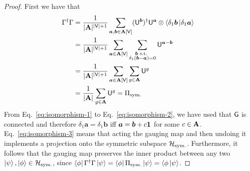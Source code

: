 \documentclass[11pt]{article}
\begin{document}
\begin{proof}
    First we have that 
\begin{align}
     \Gamma^\dagger \Gamma &= \frac{1}{|\mathbf{A}|^{|\mathsf{V}|+1}} \sum_{\bm{a}, \bm{b} \in \mathbf{A}[\mathsf{V}]} (\mathsf{U}^{\bm{b}})^\dagger \mathsf{U}^{\bm{a}} \otimes \langle \delta_1 \bm{b} \ket{\delta_1 \bm{a}} \\
     &= \frac{1}{|\mathbf{A}|^{|\mathsf{V}|+1}} \sum_{\bm{a} \in \mathbf{A}[\mathsf{V}]} \sum_{\substack{\bm{b} \text{ s.t. } \\ \delta_1 (\bm{b} - \bm{a}) = 0}} \mathsf{U}^{\bm{a} - \bm{b}} \label{eq:isomorphism-1}\\
     &= \frac{1}{|\mathbf{A}|^{|\mathsf{V}|+1}} \sum_{\bm{a} \in \mathbf{A}[\mathsf{V}]} \sum_{g \in \mathbf{A}} \mathsf{U}^g\label{eq:isomorphism-2}\\
     &= \frac{1}{|\mathbf{A}|} \sum_{g \in \mathbf{A}} \mathsf{U}^g = \Pi_{\rm sym.}\label{eq:isomorphism-3}
\end{align}
    From Eq.~\eqref{eq:isomorphism-1} to Eq.~\eqref{eq:isomorphism-2}, we have used that $\mathsf{G}$ is connected and therefore $\delta_1\bm a =\delta_1\bm b$ iff $\bm a =\bm b + c\mathbf{1}$ for some $c\in \mathbf{A}$. Eq.~\eqref{eq:isomorphism-3} means that acting the gauging map and then undoing it implements a projection onto the symmetric subspace $\mathcal H_{\rm sym.}$. Furthermore, it follows that the gauging map preserves the inner product between any two $\ket{\psi},\ket{\phi}\in \mathcal H_{\rm sym.}$, since $\bra{\phi}\Gamma^\dagger\Gamma\ket{\psi} = \bra{\phi}\Pi_{\rm sym.}\ket{\psi}=\langle\phi\ket{\psi}$.


\end{proof}
\end{document}
